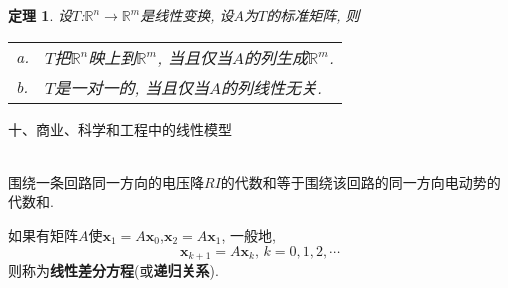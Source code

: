 \documentclass[UTF8,fontset=ubuntu]{ctexart}
\theoremstyle{nonumberplain}
\theoremstyle{break}
\newtheorem{theorem}{定理}
\theoremstyle{empty}
\begin{document}
\begin{theorem}
设$T$:$\mathbb{R}^n\rightarrow\mathbb{R}^m$是线性变换, 设$A$为$T$的标准矩阵, 则\\
\begin{tabular}{l@{\ }l}
a. & $T$把$\mathbb{R}^n$映上到$\mathbb{R}^m$, 当且仅当$A$的列生成$\mathbb{R}^m$.\\
b. & $T$是一对一的, 当且仅当$A$的列线性无关.
\end{tabular}
\end{theorem}\vspace{6ex}

十、商业、科学和工程中的线性模型\\[-2ex]
\begin{law}[基尔霍夫电压定律]\ \\
围绕一条回路同一方向的电压降$RI$的代数和等于围绕该回路的同一方向电动势的代数和.
\end{law}\vspace{4ex}

\begin{law}
如果有矩阵$A$使$\bm{x}_1=A\bm{x}_0$,$\bm{x}_2=A\bm{x}_1$, 一般地,
\[\bm{x}_{k+1}=A\bm{x}_k\text{,\ }k=0,1,2,\cdots\]
则称为\textbf{线性差分方程}(或\textbf{递归关系}).
\end{law}
\end{document}
